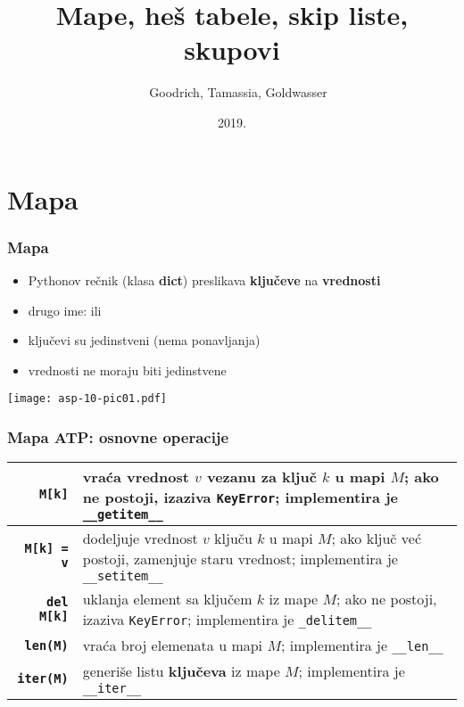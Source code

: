 \documentclass[compress]{beamer}
\title{Mape, heš tabele, skip liste, skupovi}
\author{\textcopyright \ \ Goodrich, Tamassia, Goldwasser}
\institute{Katedra za informatiku, Fakultet tehničkih nauka, Univerzitet u
Novom Sadu}
\date{2019.}
\begin{document}
\frame{\titlepage}

\section[Mapa]{Mapa}
\begin{frame}[fragile]
  \frametitle{Mapa}
  \begin{itemize}
    \item Pythonov rečnik (klasa \textbf{dict}) preslikava \textbf{ključeve} na \textbf{vrednosti} 
    \item drugo ime:  ili 
    \item ključevi su jedinstveni (nema ponavljanja)
    \item vrednosti ne moraju biti jedinstvene
  \end{itemize}
  \begin{center}
    \texttt{[image: asp-10-pic01.pdf]}
  \end{center}
\end{frame}

\begin{frame}[fragile]
  \frametitle{Mapa ATP: osnovne operacije}
  \begin{center}
    \begin{tabular}{rp{8cm}}
      \textbf{\texttt{M[k]}} & vraća vrednost $v$ vezanu za ključ $k$ u mapi $M$; ako ne postoji, izaziva \texttt{KeyError}; implementira je \texttt{\_\_getitem\_\_} \\ \hline
      \textbf{\texttt{M[k] = v}} & dodeljuje vrednost $v$ ključu $k$ u mapi $M$; ako ključ već postoji, zamenjuje staru vrednost; implementira je \texttt{\_\_setitem\_\_} \\ \hline
      \textbf{\texttt{del M[k]}} & uklanja element sa ključem $k$ iz mape $M$; ako ne postoji, izaziva \texttt{KeyError}; implementira je \texttt{\_delitem\_\_} \\ \hline
      \textbf{\texttt{len(M)}} & vraća broj elemenata u mapi $M$; implementira je \texttt{\_\_len\_\_} \\ \hline
      \textbf{\texttt{iter(M)}} & generiše listu \textbf{ključeva} iz mape $M$;  implementira je \texttt{\_\_iter\_\_} \\
    \end{tabular}
  \end{center}
\end{frame}
\end{document}
